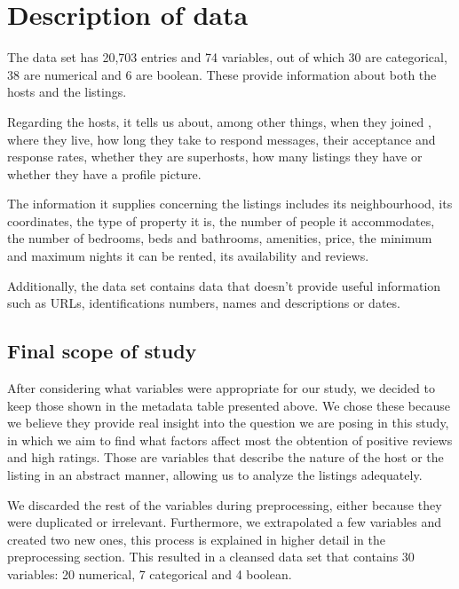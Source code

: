 


\section{Description of data}%
\label{sec:description_of_data}

The data set has 20,703 entries and 74 variables, out of which 30 are categorical,
38 are numerical and 6 are boolean. These provide information about both the hosts 
and the listings.

Regarding the hosts, it tells us about, among other things, when they joined
\airbnb, where they live, how long they take to respond 
messages, their acceptance and response rates, whether they are superhosts, how 
many listings they have or whether they have a profile picture.

The information it supplies concerning the listings includes its
neighbourhood, its coordinates, the type of property it is, the number of people 
it accommodates, the number of bedrooms, beds and bathrooms, amenities, price, 
the minimum and maximum nights it can be rented, its availability and reviews.

Additionally, the data set contains data that doesn't provide useful information such
as URLs, identifications numbers, names and descriptions or dates.






\subsection{Final scope of study}

After considering what variables were appropriate for our study, we decided to keep 
those shown in the metadata table presented above. We chose these because
we believe they provide real insight into the question we are posing in this study,
in which we aim to find what factors affect most the obtention of positive reviews
and high ratings. Those are variables that describe the nature of the host or
the listing in an abstract manner, allowing us to analyze the listings adequately.

We discarded the rest
of the variables during preprocessing, either because they were duplicated or
irrelevant. Furthermore, we extrapolated a few variables and created 
two new ones, this process is explained in higher detail in the preprocessing 
section. This resulted in a cleansed data set that contains 30 variables: 
20 numerical, 7 categorical and 4 boolean.